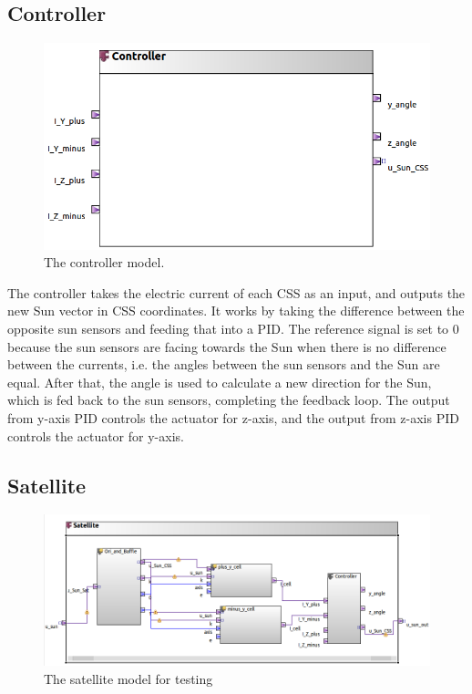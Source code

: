 \newpage
\subsection{Controller}
\begin{figure}[H]
    \centering
    \includegraphics[width=0.6\linewidth]{doc//Graphics/controllerModel.png}
    \caption{The controller model.}
    \label{fig:controllerModel}
\end{figure}

The controller takes the electric current of each CSS as an input, and outputs the new Sun vector in CSS coordinates. It works by taking the difference between the opposite sun sensors and feeding that into a PID. The reference signal is set to 0 because the sun sensors are facing towards the Sun when there is no difference between the currents, i.e. the angles between the sun sensors and the Sun are equal. After that, the angle is used to calculate a new direction for the Sun, which is fed back to the sun sensors, completing the feedback loop. The output from y-axis PID controls the actuator for z-axis, and the output from z-axis PID controls the actuator for y-axis.

\subsection{Satellite}
\begin{figure}[H]
    \centering
    \includegraphics[width=1.0\linewidth]{doc//Graphics/satellite.png}
    \caption{The satellite model for testing}
    \label{fig:satelliteModel}
\end{figure}

